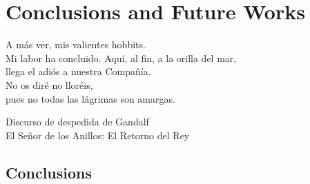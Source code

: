 % 
% 
% 
% 
% 
% 
% 

\chapter{Conclusions and Future Works}
\label{cha:conclusions_and_future_works}

\begin{FraseCelebre}
	\begin{Frase}
		A más ver, mis valientes hobbits. \\
		Mi labor ha concluido. Aquí, al fin, a la orilla del mar, \\
		llega el adiós a nuestra Compañía. \\
		No os diré no lloréis, \\
		pues no todas las lágrimas son amargas.
	\end{Frase}
	\begin{Fuente}
		Discurso de despedida de Gandalf \\
		El Señor de los Anillos: El Retorno del Rey
	\end{Fuente}
\end{FraseCelebre}

\section{Conclusions}
\label{sec:9_conclusions}


